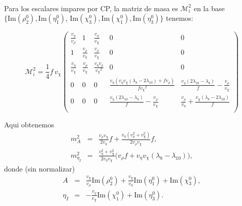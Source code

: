 \  \ 

Para los escalares impares por CP, la matriz de masa es $\mathcal{M}_{i}^2$ en la base $\{ \text{Im}(\rho_2^0), \text{Im}(\eta_1^0)$, $\text{Im}(\chi_3^0), \text{Im}(\chi_1^0), \text{Im}(\eta_3^0) \}$  tenemos:
\begin{small}
\[
\mathcal{M}_{i}^2 =\frac{1}{4} f\, v_\chi
\left(
\begin{array}{ccccc}
 \frac{{v_\eta }}{{v_\rho }} & 1 & \frac{{v_\eta }}{{v_\chi }} & 0 & 0 \\
 1 & \frac{{v_\rho }}{{v_\eta }} & \frac{{v_\rho }}{{v_\chi }} & 0 & 0 \\
 \frac{{v_\eta }}{{v_\chi }} & \frac{{v_\rho }}{{v_\chi }} & \frac{{v_\eta } {v_\rho }}{{v_\chi }^2} & 0 & 0 \\
 0 & 0 & 0 & \frac{{v_\eta } ({v_\eta } {v_\chi } ({\lambda_ 8}-2 {\lambda_ {10}})+{f} {v_\rho })}{{f} {v_\chi }^2} & \frac{{v_\eta } (2 {\lambda_ {10}}-{\lambda_ 8})}{{f}}-\frac{{v_\rho }}{{v_\chi }} \\
 0 & 0 & 0 & \frac{{v_\eta } (2 {\lambda_ {10}}-{\lambda_ 8})}{{f}}-\frac{{v_\rho }}{{v_\chi }} & \frac{{v_\rho }}{{v_\eta }}+\frac{{v_\chi } ({\lambda_ 8}-2 {\lambda_ {10}})}{{f}} \\
\end{array}
\right)
\]
\end{small}

Aqui obtenemos
\begin{eqnarray}
m_A^2 &=& \frac{v_\rho v_\chi}{2v_\eta} f + \frac{v_\eta (v_\rho^2 + v_\chi^2)}{2v_\rho v_\chi}f, \nonumber \\
m_{\eta_I}^2 &=& \frac{v_\eta^2 + v_\chi^2}{2v_\eta v_\chi} \bigg( v_\rho f+v_\eta v_\chi (\lambda_8-\lambda_{10}) \bigg),
\end{eqnarray}
donde (sin normalizar)
\begin{eqnarray}
A &=& \frac{v_\chi}{v_\rho} \text{Im}(\rho_2^0) + \frac{v_\chi}{v_\eta} \text{Im}(\eta_1^0) + \text{Im}(\chi_3^0), \nonumber \\
\eta_I &=& -\frac{v_\eta}{v_\chi} \text{Im}(\chi_1^0) + \text{Im}(\eta_3^0).
\end{eqnarray}

